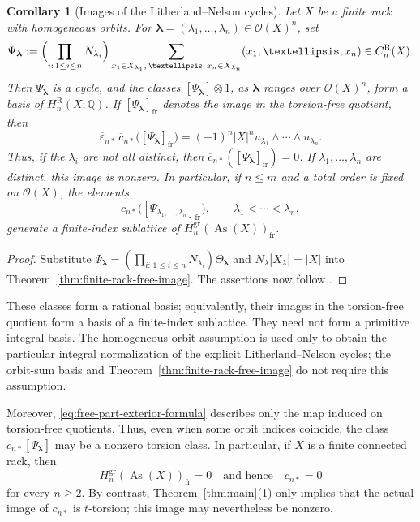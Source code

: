 \documentclass[10pt,a4paper]{amsart}
\newtheorem{corollary}[theorem]{Corollary}
\DeclareMathOperator{\As}{As}
\newcommand{\QQ}{\mathbb Q}
\newcommand{\OO}{\mathcal O}
\newcommand{\gr}{\mathrm{gr}}
\newcommand{\R}{\mathrm R}
\begin{document}
\begin{corollary}[Images of the Litherland--Nelson cycles]
Let $X$ be a finite rack with homogeneous orbits. For
$\boldsymbol\lambda=(\lambda_1,\ldots,\lambda_n)\in\OO(X)^n$, set
\[
\Psi_{\boldsymbol\lambda}
 :=\Bigl(\prod_{i:\,1\le i\le n}N_{\lambda_i}\Bigr)
 \sum_{x_1\in X_{\lambda_1},\,\ldots,\,x_n\in X_{\lambda_n}}
 (x_1,\ldots,x_n)
 \in C_n^\R(X).
\]
Then $\Psi_{\boldsymbol\lambda}$ is a cycle, and the classes
$[\Psi_{\boldsymbol\lambda}]\otimes1$, as
$\boldsymbol\lambda$ ranges over $\OO(X)^n$, form a basis of
$H_n^\R(X;\QQ)$. If
$[\Psi_{\boldsymbol\lambda}]_{\mathrm{fr}}$ denotes the image in the
torsion-free quotient, then
\[
\overline\varepsilon_{n*}\,\overline c_{n*}
 \bigl([\Psi_{\boldsymbol\lambda}]_{\mathrm{fr}}\bigr)
 =(-1)^n|X|^n
 u_{\lambda_1}\wedge\cdots\wedge u_{\lambda_n}.
\]
Thus, if the $\lambda_i$ are not all distinct, then
$\overline c_{n*}([\Psi_{\boldsymbol\lambda}]_{\mathrm{fr}})=0$. If
$\lambda_1,\ldots,\lambda_n$ are distinct, this image is nonzero. In
particular, if $n\le m$ and a total order is fixed on $\OO(X)$, the elements
\[
 \overline c_{n*}
 \bigl([\Psi_{\lambda_1,\ldots,\lambda_n}]_{\mathrm{fr}}\bigr),
 \qquad \lambda_1<\cdots<\lambda_n,
\]
generate a finite-index sublattice of
$H_n^{\gr}(\As(X))_{\mathrm{fr}}$.
\end{corollary}

\begin{proof}
Substitute
$\Psi_{\boldsymbol\lambda}=(\prod_{i:\,1\le i\le n}N_{\lambda_i})
\Theta_{\boldsymbol\lambda}$ and
$N_\lambda|X_\lambda|=|X|$ into
Theorem~\ref{thm:finite-rack-free-image}. The assertions now follow
\cite[\S3]{LitherlandNelson}.
\end{proof}

These classes form a rational basis; equivalently, their images in
the torsion-free quotient form a basis of a finite-index sublattice.
They need not form a primitive integral basis. The homogeneous-orbit
assumption is used only to obtain the particular integral
normalization of the explicit Litherland--Nelson cycles; the orbit-sum
basis and Theorem~\ref{thm:finite-rack-free-image} do not require this
assumption.

Moreover, \eqref{eq:free-part-exterior-formula} describes only the map
induced on torsion-free quotients. Thus, even when some orbit indices
coincide, the class $c_{n*}[\Psi_{\boldsymbol\lambda}]$ may be a nonzero
torsion class. In particular, if $X$ is a finite connected rack, then
\[
 H_n^{\gr}(\As(X))_{\mathrm{fr}}=0
 \quad\text{and hence}\quad
 \overline c_{n*}=0
\]
for every $n\ge2$. By contrast, Theorem~\ref{thm:main}(1) only implies
that the actual image of $c_{n*}$ is $t$-torsion; this image may nevertheless
be nonzero.
\end{document}
